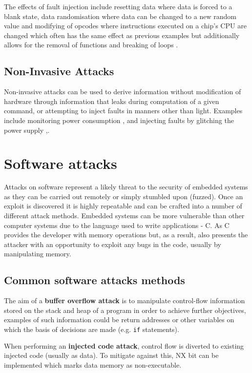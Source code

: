 The effects of fault injection include resetting data where data is forced to a blank state, data randomisation where data can be changed to a new random value and modifying of opcodes where instructions executed on a chip's CPU are changed which often has the same effect as previous examples but additionally allows for the removal of functions and breaking of loops \cite{Anderson1996}. 
\ifnotesincluded
{}
\fi
  
\subsection{Non-Invasive Attacks}
Non-invasive attacks can be used to derive information without modification of hardware through information that leaks during computation of a given command, or attempting to inject faults in manners other than light. Examples include monitoring power consumption \cite{Maurer1999},\cite{MangardStefan2007Paa:} and injecting faults by glitching the power supply \cite{Anderson1996},\cite{Bar-el2006}.

\section{Software attacks}

Attacks on software represent a likely threat to the security of embedded systems as they can be carried out remotely or simply stumbled upon (fuzzed). Once an exploit is discovered it is highly repeatable and can be crafted into a number of different attack methods. Embedded systems can be more vulnerable than other computer systems due to the language used to write applications - C. As C provides the developer with memory operations but, as a result, also presents the attacker with an opportunity to exploit any bugs in the code, usually by manipulating memory.

\subsection{Common software attacks methods}

The aim of a \textbf{buffer overflow attack} is to manipulate control-flow information stored on the stack and heap of a program in order to achieve further objectives, examples of such information could be return addresses or other variables on which the basis of decisions are made (e.g. \verb|if| statements).

When performing an \textbf{injected code attack}, control flow is diverted to existing injected code (usually as data). To mitigate against this, NX bit can be implemented which marks data memory as non-executable.

